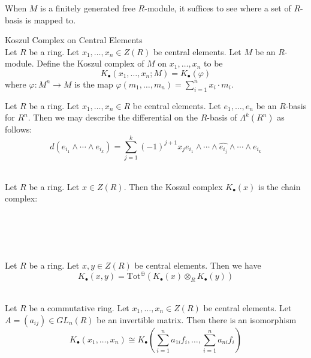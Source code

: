 \documentclass[a4paper]{article}
\begin{document}
When $M$ is a finitely generated free $R$-module, it suffices to see where a set of $R$-basis is mapped to. 

\begin{defn}{Koszul Complex on Central Elements}{}\\
Let $R$ be a ring. Let $x_1,\dots,x_n\in Z(R)$ be central elements. Let $M$ be an $R$-module. Define the Koszul complex of $M$ on $x_1,\dots,x_n$ to be $$K_\bullet(x_1,\dots,x_n;M)=K_\bullet(\varphi)$$ where $\varphi:M^n\to M$ is the map $\varphi(m_1,\dots,m_n)=\sum_{i=1}^nx_i\cdot m_i$. 
\end{defn}

Let $R$ be a ring. Let $x_1,\dots,x_n\in R$ be central elements. Let $e_1,\dots,e_n$ be an $R$-basis for $R^n$. Then we may describe the differential on the $R$-basis of $\Lambda^k(R^n)$ as follows: $$d(e_{i_1}\wedge\cdots\wedge e_{i_k})=\sum_{j=1}^k(-1)^{j+1}x_je_{i_1}\wedge\cdots\wedge\widehat{e_{i_j}}\wedge\cdots\wedge e_{i_k}$$

\begin{eg}{}{}\\
Let $R$ be a ring. Let $x\in Z(R)$. Then the Koszul complex $K_\bullet(x)$ is the chain complex: \\~\\
 \\~\\
\end{eg}

\begin{lmm}{}{}\\
Let $R$ be a ring. Let $x,y\in Z(R)$ be central elements. Then we have $$K_\bullet(x,y)=\text{Tot}^\oplus\left(K_\bullet(x)\otimes_R K_\bullet(y)\right)$$
\end{lmm}

\begin{lmm}{}{}\\
Let $R$ be a commutative ring. Let $x_1,\dots,x_n\in Z(R)$ be central elements. Let $A=(a_{ij})\in GL_n(R)$ be an invertible matrix. Then there is an isomorphism $$K_\bullet(x_1,\dots,x_n)\cong K_\bullet\left(\sum_{i=1}^na_{1i}f_i,\dots,\sum_{i=1}^na_{ni}f_i\right)$$
\end{lmm}
\end{document}

